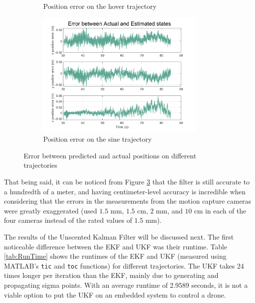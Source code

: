 \documentclass[letterpaper, paper,11pt]{AAS}	%
\begin{document}
\begin{figure}[htb]
\begin{subfigure}{.5\textwidth}
	\caption{Position error on the hover trajectory}
	\label{fig:SquareErr5}
\end{subfigure}%
\begin{subfigure}{.5\textwidth}
	\centering
	\includegraphics[width=0.9\textwidth]{../sine1_err}
	\caption{Position error on the sine trajectory}
	\label{fig:SquareErr10}
\end{subfigure}
\caption{Error between predicted and actual positions on different trajectories}
\label{fig:SquareErr}
\end{figure}

That being said, it can be noticed from Figure \ref{fig:SquareErr} that the filter is still accurate to a hundredth of a meter, and having centimeter-level accuracy is incredible when considering that the errors in the measurements from the motion capture cameras were greatly exaggerated (used $1.5$ mm, $1.5$ cm, $2$ mm, and $10$ cm in each of the four cameras instead of the rated values of $1.5$ mm\cite{vicon_2022}). %

The results of the Unscented Kalman Filter will be discussed next. The first noticeable difference between the EKF and UKF was their runtime. Table \ref{tab:RunTime} shows the runtimes of the EKF and UKF (measured using MATLAB's \texttt{tic} and \texttt{toc} functions) for different trajectories. The UKF takes 24 times longer per iteration than the EKF, mainly due to generating and propagating sigma points. With an average runtime of 2.9589 seconds, it is not a viable option to put the UKF on an embedded system to control a drone.
\end{document}
